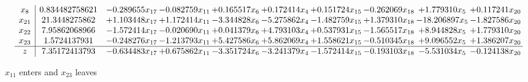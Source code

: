 \documentclass[10pt]{article}
\begin{document}
\[\begin{array}{c| c c@{\hskip 2pt} c@{\hskip 2pt} c@{\hskip 2pt} c@{\hskip 2pt} c@{\hskip 2pt} c@{\hskip 2pt} c@{\hskip 2pt} c@{\hskip 2pt} }
 x_{8}   &  0.834482758621 & -0.289655 x_{17} & -0.082759 x_{11} & + 0.165517 x_{6} & + 0.172414 x_{4} & + 0.151724 x_{15} & -0.262069 x_{18} & + 1.779310 x_{5} & + 0.117241 x_{20}\\
 x_{21}   &  21.3448275862 & + 1.103448 x_{17} & + 1.172414 x_{11} & -3.344828 x_{6} & -5.275862 x_{4} & -1.482759 x_{15} & + 1.379310 x_{18} & -18.206897 x_{5} & -1.827586 x_{20}\\
 x_{22}   &  7.95862068966 & -1.572414 x_{17} & -0.020690 x_{11} & + 0.041379 x_{6} & + 4.793103 x_{4} & + 0.537931 x_{15} & -1.565517 x_{18} & + 8.944828 x_{5} & + 1.779310 x_{20}\\
 x_{23}   &  1.5724137931 & -0.248276 x_{17} & -1.213793 x_{11} & + 5.427586 x_{6} & + 5.862069 x_{4} & + 1.558621 x_{15} & -0.510345 x_{18} & + 9.096552 x_{5} & + 1.386207 x_{20}\\
\hline
z    &  7.35172413793 & -0.634483 x_{17} & + 0.675862 x_{11} & -3.351724 x_{6} & -3.241379 x_{4} & -1.572414 x_{15} & -0.193103 x_{18} & -5.531034 x_{5} & -0.124138 x_{20}\\
\end{array}\]


 $ x_{11} $ enters and $ x_{23} $ leaves 
\end{document}
